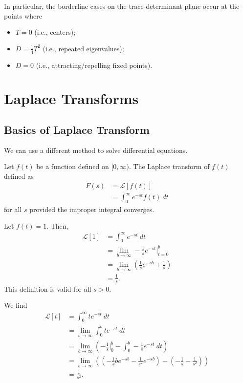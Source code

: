 \documentclass[10pt]{mypackage}
\begin{document}
In particular, the borderline cases on the trace-determinant plane occur at the points where
\begin{itemize}
  \item $T = 0$ (i.e., centers);
  \item $D = \frac{1}{4}T^2$ (i.e., repeated eigenvalues);
  \item $D = 0$ (i.e., attracting/repelling fixed points).
\end{itemize}
\section{Laplace Transforms}%
\subsection{Basics of Laplace Transform}%
We can use a different method to solve differential equations. 
\begin{definition}
  Let $f(t)$ be a function defined on $[0,\infty)$. The Laplace transform of $f(t)$ defined as
  \begin{align*}
    F(s) &= \mathcal{L}\left[f(t)\right]\\
         &= \int_{0}^{\infty} e^{-st}f(t)\:dt
  \end{align*}
  for all $s$ provided the improper integral converges.
\end{definition}
\begin{example}
  Let $f(t) = 1$. Then,
  \begin{align*}
    \mathcal{L}\left[1\right] &= \int_{0}^{\infty} e^{-st}\:dt\\
                              &= \lim_{b\rightarrow\infty}-\frac{1}{s}e^{-st}\bigr\vert_{t=0}^{b}\\
                              &= \lim_{b\rightarrow\infty}\left(\frac{1}{s}e^{-sb} + \frac{1}{s}\right)\\
                              &= \frac{1}{s}.
  \end{align*}
  This definition is valid for all $s > 0$.
\end{example}
\begin{example}
  We find
  \begin{align*}
    \mathcal{L}\left[t\right] &= \int_{0}^{\infty} te^{-st}\:dt\\
                              &= \lim_{b\rightarrow\infty}\int_{0}^{b} te^{-st}\:dt\\
                              &= \lim_{b\rightarrow\infty}\left(-\frac{1}{s}\bigr\vert_{0}^{b} - \int_{0}^{b} -\frac{1}{s}e^{-st}\:dt\right)\\
                              &= \lim_{b\rightarrow\infty}\left(\left(-\frac{1}{s}be^{-sb} - \frac{1}{s^2}e^{-sb}\right) - \left(-\frac{1}{s} - \frac{1}{s^2}\right)\right)\\
                              &= \frac{1}{s^2}.
  \end{align*}
  
\end{example}
\end{document}
